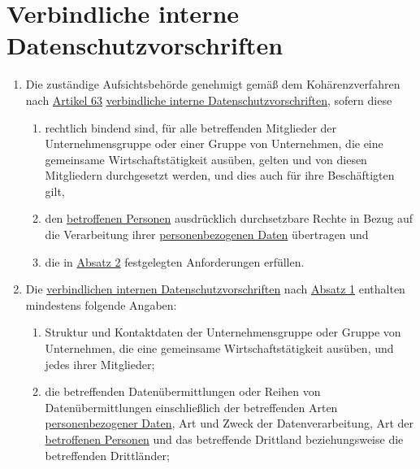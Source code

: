 \chapter{Verbindliche interne Datenschutzvorschriften}
\label{ch:47}


\begin{enumerate}

  \item Die zuständige Aufsichtsbehörde genehmigt gemäß dem Kohärenzverfahren nach \hyperref[ch:63]{Artikel 63}
   \hyperref[itm:04-20]{verbindliche interne Datenschutzvorschriften}, sofern diese
  \label{itm:47-1}

  \begin{enumerate}
  
    \item rechtlich bindend sind, für alle betreffenden Mitglieder der Unternehmensgruppe oder einer Gruppe von
     Unternehmen, die eine gemeinsame Wirtschaftstätigkeit ausüben, gelten und von diesen Mitgliedern durchgesetzt
     werden, und dies auch für ihre Beschäftigten gilt,
    \label{itm:47-1a}

    \item den \hyperref[itm:04-1]{betroffenen Personen} ausdrücklich durchsetzbare Rechte in Bezug auf die Verarbeitung ihrer
     \hyperref[itm:04-1]{personenbezogenen Daten} übertragen und
    \label{itm:47-1b}

    \item die in \hyperref[itm:47-2]{Absatz 2} festgelegten Anforderungen erfüllen.
    \label{itm:47-1c}

  \end{enumerate}

  \item Die \hyperref[itm:04-20]{verbindlichen internen Datenschutzvorschriften} nach \hyperref[itm:47-1]{Absatz 1} enthalten mindestens
   folgende Angaben:
  \label{itm:47-2}

  \begin{enumerate}
  
    \item Struktur und Kontaktdaten der Unternehmensgruppe oder Gruppe von Unternehmen, die eine gemeinsame
     Wirtschaftstätigkeit ausüben, und jedes ihrer Mitglieder;
    \label{itm:4722a}

    \item die betreffenden Datenübermittlungen oder Reihen von Datenübermittlungen einschließlich der betreffenden Arten
     \hyperref[itm:04-1]{personenbezogener Daten}, Art und Zweck der Datenverarbeitung, Art der \hyperref[itm:04-1]{betroffenen Personen} und das betreffende
     Drittland beziehungsweise die betreffenden Drittländer;
    \label{itm:47-2b}


\end{enumerate}
\end{enumerate}
